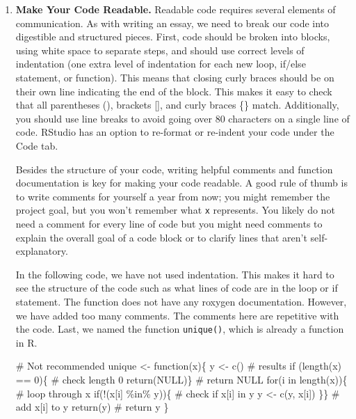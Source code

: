 \documentclass[
  letterpaper,
]{latex/krantz}
\makeatletter
\newenvironment{Shaded}{\begin{snugshade}}{\end{snugshade}}
\newcommand{\CommentTok}[1]{\textcolor[rgb]{0.37,0.37,0.37}{#1}}
\newcommand{\ConstantTok}[1]{\textcolor[rgb]{0.56,0.35,0.01}{#1}}
\newcommand{\ControlFlowTok}[1]{\textcolor[rgb]{0.00,0.23,0.31}{#1}}
\newcommand{\DecValTok}[1]{\textcolor[rgb]{0.68,0.00,0.00}{#1}}
\newcommand{\FunctionTok}[1]{\textcolor[rgb]{0.28,0.35,0.67}{#1}}
\newcommand{\NormalTok}[1]{\textcolor[rgb]{0.00,0.23,0.31}{#1}}
\newcommand{\OtherTok}[1]{\textcolor[rgb]{0.00,0.23,0.31}{#1}}
\newcommand{\SpecialCharTok}[1]{\textcolor[rgb]{0.37,0.37,0.37}{#1}}
\newenvironment{kframe}{%
\medskip{}
\setlength{\fboxsep}{.8em}
 \def\at@end@of@kframe{}%
 \ifinner\ifhmode%
  \def\at@end@of@kframe{\end{minipage}}%
  \begin{minipage}{\columnwidth}%
 \fi\fi%
 \def\FrameCommand##1{\hskip\@totalleftmargin \hskip-\fboxsep
 \colorbox{shadecolor}{##1}\hskip-\fboxsep
     \hskip-\linewidth \hskip-\@totalleftmargin \hskip\columnwidth}%
 \MakeFramed {\advance\hsize-\width
   \@totalleftmargin\z@ \linewidth\hsize
   \@setminipage}}%
 {\par\unskip\endMakeFramed%
 \at@end@of@kframe}
\renewenvironment{Shaded}{\begin{kframe}}{\end{kframe}}
\makeatother
\begin{document}
\begin{enumerate}
\def\labelenumi{\arabic{enumi}.}
\setcounter{enumi}{1}
\item
  \textbf{Make Your Code Readable.} Readable code requires several
  elements of communication. As with writing an essay, we need to break
  our code into digestible and structured pieces. First, code should be
  broken into blocks, using white space to separate steps, and should
  use correct levels of indentation (one extra level of indentation for
  each new loop, if/else statement, or function). This means that
  closing curly braces should be on their own line indicating the end of
  the block. This makes it easy to check that all parentheses (),
  brackets {[}{]}, and curly braces \{\} match. Additionally, you should
  use line breaks to avoid going over 80 characters on a single line of
  code. RStudio has an option to re-format or re-indent your code under
  the Code tab.

  Besides the structure of your code, writing helpful comments and
  function documentation is key for making your code readable. A good
  rule of thumb is to write comments for yourself a year from now; you
  might remember the project goal, but you won't remember what
  \texttt{x} represents. You likely do not need a comment for every line
  of code but you might need comments to explain the overall goal of a
  code block or to clarify lines that aren't self-explanatory.

  In the following code, we have not used indentation. This makes it
  hard to see the structure of the code such as what lines of code are
  in the loop or if statement. The function does not have any roxygen
  documentation. However, we have added too many comments. The comments
  here are repetitive with the code. Last, we named the function
  \texttt{unique()}, which is already a function in R.

\begin{Shaded}
\begin{Highlighting}[]
\CommentTok{\# Not recommended}
\NormalTok{unique }\OtherTok{\textless{}{-}} \ControlFlowTok{function}\NormalTok{(x)\{}
\NormalTok{y }\OtherTok{\textless{}{-}} \FunctionTok{c}\NormalTok{() }\CommentTok{\# results}
\ControlFlowTok{if}\NormalTok{ (}\FunctionTok{length}\NormalTok{(x) }\SpecialCharTok{==} \DecValTok{0}\NormalTok{)\{ }\CommentTok{\# check length 0}
\FunctionTok{return}\NormalTok{(}\ConstantTok{NULL}\NormalTok{)\} }\CommentTok{\# return NULL}
\ControlFlowTok{for}\NormalTok{(i }\ControlFlowTok{in} \FunctionTok{length}\NormalTok{(x))\{  }\CommentTok{\# loop through x}
\ControlFlowTok{if}\NormalTok{(}\SpecialCharTok{!}\NormalTok{(x[i] }\SpecialCharTok{\%in\%}\NormalTok{ y))\{  }\CommentTok{\# check if x[i] in y}
\NormalTok{y }\OtherTok{\textless{}{-}} \FunctionTok{c}\NormalTok{(y, x[i]) \}\} }\CommentTok{\# add x[i] to y}
\FunctionTok{return}\NormalTok{(y) }\CommentTok{\# return y}
\NormalTok{\}}
\end{Highlighting}
\end{Shaded}


\end{enumerate}
\end{document}
